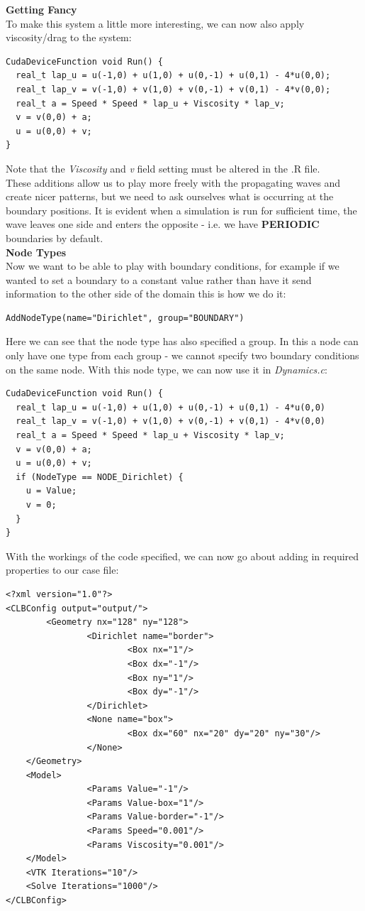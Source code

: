 \documentclass[12pt,a4paper]{report}
\begin{document}
\textbf{Getting Fancy}\\
To make this system a little more interesting, we can now also apply viscosity/drag to the system:
\begin{lstlisting}
CudaDeviceFunction void Run() {
  real_t lap_u = u(-1,0) + u(1,0) + u(0,-1) + u(0,1) - 4*u(0,0);
  real_t lap_v = v(-1,0) + v(1,0) + v(0,-1) + v(0,1) - 4*v(0,0);
  real_t a = Speed * Speed * lap_u + Viscosity * lap_v;
  v = v(0,0) + a;
  u = u(0,0) + v;
}
\end{lstlisting}
Note that the \textit{Viscosity} and \textit{v}
field setting must be altered in the .R file. \\

These additions allow us to play more freely with the propagating waves and create nicer patterns, but we need to ask ourselves what is occurring at the boundary positions. It is evident when a simulation is run for sufficient time, the wave leaves one side and enters the opposite - i.e. we have \textbf{PERIODIC} boundaries by default. \\

\textbf{Node Types} \\
Now we want to be able to play with boundary conditions, for example if we wanted to set a boundary to a constant value rather than have it send information to the other side of the domain this is how we do it:
\begin{lstlisting}
AddNodeType(name="Dirichlet", group="BOUNDARY")
\end{lstlisting}
Here we can see that the node type has also specified a group. In this a node can only have one type from each group - we cannot specify two boundary conditions on the same node. With this node type, we can now use it in \textit{Dynamics.c}:
\begin{lstlisting}
CudaDeviceFunction void Run() {
  real_t lap_u = u(-1,0) + u(1,0) + u(0,-1) + u(0,1) - 4*u(0,0)
  real_t lap_v = v(-1,0) + v(1,0) + v(0,-1) + v(0,1) - 4*v(0,0)
  real_t a = Speed * Speed * lap_u + Viscosity * lap_v;
  v = v(0,0) + a;
  u = u(0,0) + v;
  if (NodeType == NODE_Dirichlet) {
    u = Value;
    v = 0;
  }
}
\end{lstlisting}

With the workings of the code specified, we can now go about adding in required properties to our case file:
\begin{lstlisting}
<?xml version="1.0"?>
<CLBConfig output="output/">
        <Geometry nx="128" ny="128">
                <Dirichlet name="border">
                        <Box nx="1"/>
                        <Box dx="-1"/>
                        <Box ny="1"/>
                        <Box dy="-1"/>
                </Dirichlet>
                <None name="box">
                        <Box dx="60" nx="20" dy="20" ny="30"/>
                </None>
    </Geometry>
    <Model>
                <Params Value="-1"/>
                <Params Value-box="1"/>
                <Params Value-border="-1"/>
                <Params Speed="0.001"/>
                <Params Viscosity="0.001"/>
    </Model>
    <VTK Iterations="10"/>
    <Solve Iterations="1000"/>
</CLBConfig>
\end{lstlisting}
\end{document}
